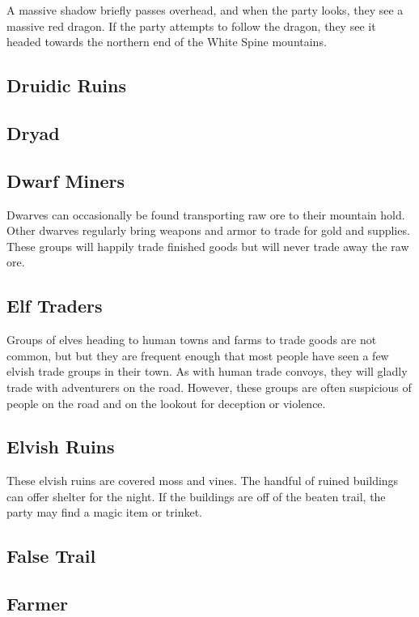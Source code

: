 A massive shadow briefly passes overhead, and when the party looks, they see a massive red dragon.
If the party attempts to follow the dragon, they see it headed towards the northern end of the White Spine mountains.

\subsection{Druidic Ruins}

\subsection{Dryad}

\subsection{Dwarf Miners}

Dwarves can occasionally be found transporting raw ore to their mountain hold.
Other dwarves regularly bring weapons and armor to trade for gold and supplies.
These groups will happily trade finished goods but will never trade away the raw ore.

\subsection{Elf Traders}

Groups of elves heading to human towns and farms to trade goods are not common, but but they are frequent enough that most people have seen a few elvish trade groups in their town.
As with human trade convoys, they will gladly trade with adventurers on the road.
However, these groups are often suspicious of people on the road and on the lookout for deception or violence.

\subsection{Elvish Ruins}

These elvish ruins are covered moss and vines.
The handful of ruined buildings can offer shelter for the night.
If the buildings are off of the beaten trail, the party may find a magic item or trinket.

\subsection{False Trail}

\subsection{Farmer}

